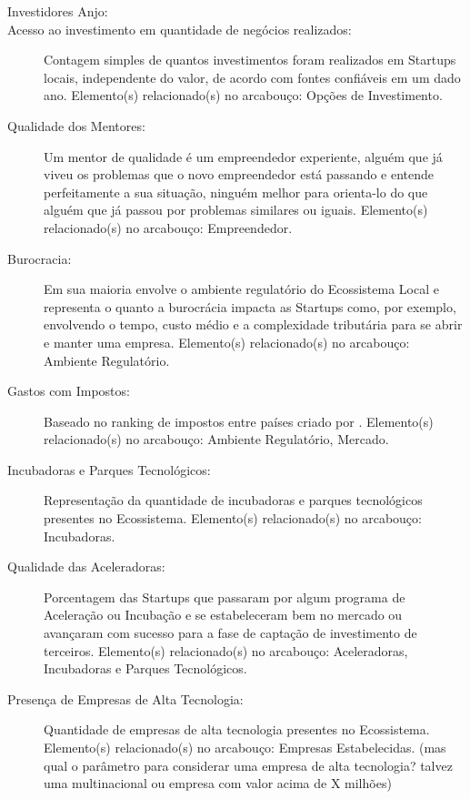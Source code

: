 \begin{apendicesenv}
\begin{description}
  \item [Investidores Anjo: ]

  \item [Acesso ao investimento em quantidade de negócios realizados:] Contagem simples de quantos investimentos foram realizados em Startups locais, independente do valor, de acordo com fontes confiáveis em um dado ano. Elemento(s) relacionado(s) no arcabouço: Opções de Investimento.

  \item [Qualidade dos Mentores:] Um mentor de qualidade é um empreendedor experiente, alguém que já viveu os problemas que o novo empreendedor está passando e entende perfeitamente a sua situação, ninguém melhor para orienta-lo do que alguém que já passou por problemas similares ou iguais. Elemento(s) relacionado(s) no arcabouço: Empreendedor.

  \item [Burocracia:] Em sua maioria envolve o ambiente regulatório do Ecossistema Local e representa o quanto a burocrácia impacta as Startups como, por exemplo, envolvendo o tempo, custo médio e a complexidade tributária para se abrir e manter uma empresa. Elemento(s) relacionado(s) no arcabouço: Ambiente Regulatório.

  \item [Gastos com Impostos:] Baseado no ranking de impostos entre países criado por . Elemento(s) relacionado(s) no arcabouço: Ambiente Regulatório, Mercado. 

  \item [Incubadoras e Parques Tecnológicos:] Representação da quantidade de incubadoras e parques tecnológicos presentes no Ecossistema. Elemento(s) relacionado(s) no arcabouço: Incubadoras.

  \item [Qualidade das Aceleradoras:] Porcentagem das Startups que passaram por algum programa de Aceleração ou Incubação e se estabeleceram bem no mercado ou avançaram com sucesso para a fase de captação de investimento de terceiros. Elemento(s) relacionado(s) no arcabouço: Aceleradoras, Incubadoras e Parques Tecnológicos.

  \item [Presença de Empresas de Alta Tecnologia:] Quantidade de empresas de alta tecnologia presentes no Ecossistema. Elemento(s) relacionado(s) no arcabouço: Empresas Estabelecidas. (mas qual o parâmetro para considerar uma empresa de alta tecnologia? talvez uma multinacional ou empresa com valor acima de X milhões)


\end{description}
\end{apendicesenv}
